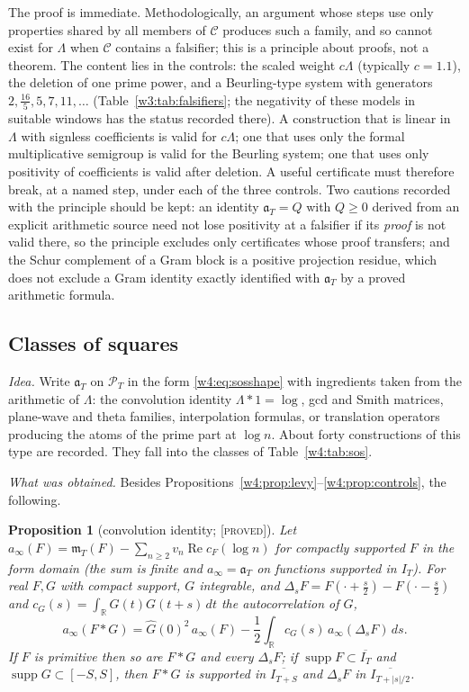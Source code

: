 \documentclass[11pt]{amsart}
\newtheorem{proposition}[theorem]{Proposition}
\theoremstyle{definition}
\theoremstyle{remark}
\numberwithin{equation}{section}
\newcommand{\R}{\mathbb{R}}
\DeclareMathOperator{\Rel}{Re}
\DeclareMathOperator{\supp}{supp}
\newcommand{\IT}{I_T}                                  %
\newcommand{\cF}{c_F}                                  %
\newcommand{\PT}{\mathcal{P}_T}                        %
\newcommand{\mT}{\mathfrak{m}_T}                       %
\newcommand{\aT}{\mathfrak{a}_T}                       %
\newcommand{\stag}[1]{\textsc{[#1]}}
\newcommand{\PROVED}{\stag{proved}}
\newcommand{\entry}[1]{\par\smallskip\noindent\textit{#1.}\enspace}
\begin{document}
The proof is immediate. Methodologically, an argument whose steps use only properties shared by all members of $\mathcal C$
produces such a family, and so cannot exist for $\Lambda$ when $\mathcal C$ contains a falsifier; this is a principle about proofs,
not a theorem. The content lies in the controls: the scaled weight $c\Lambda$ (typically $c=1.1$), the deletion of one prime
power, and a Beurling-type system with generators $2,\frac{16}5,5,7,11,\dots$ (Table~\ref{w3:tab:falsifiers}; the negativity of
these models in suitable windows has the status recorded there). A construction that is linear in $\Lambda$ with signless
coefficients is valid for $c\Lambda$; one that uses only the formal multiplicative semigroup is valid for the Beurling system; one
that uses only positivity of coefficients is valid after deletion. A useful certificate must therefore break, at a named step, under
each of the three controls. Two cautions recorded with the principle should be kept: an identity $\aT=Q$ with $Q\ge0$ derived
from an explicit arithmetic source need not lose positivity at a falsifier if its \emph{proof} is not valid there, so the
principle excludes only certificates whose proof transfers; and the Schur complement of a Gram block is a positive projection
residue, which does not exclude a Gram identity exactly identified with $\aT$ by a proved arithmetic formula.

\subsection{Classes of squares}\label{w4:fam:R1}

\entry{Idea} Write $\aT$ on $\PT$ in the form \eqref{w4:eq:sosshape} with ingredients taken from the arithmetic of $\Lambda$: the
convolution identity $\Lambda*1=\log$, gcd and Smith matrices, plane-wave and theta families, interpolation formulas, or translation
operators producing the atoms of the prime part at $\log n$. About forty constructions of this type are recorded. They fall into the
classes of Table~\ref{w4:tab:sos}.

\entry{What was obtained} Besides Propositions~\ref{w4:prop:levy}--\ref{w4:prop:controls}, the following.

\begin{proposition}[convolution identity; \PROVED]\label{w4:prop:conv}
Let $a_\infty(F)=\mT(F)-\sum_{n\ge2}v_n\Rel\cF(\log n)$ for compactly supported $F$ in the form domain (the sum is finite and
$a_\infty=\aT$ on functions supported in $\IT$). For real $F,G$ with compact support, $G$ integrable, and $\Delta_sF=F(\cdot+\frac s2)-F(\cdot-\frac s2)$ and $c_G(s)=\int_\R G(t)G(t+s)\,dt$ the autocorrelation of $G$,
\[
a_\infty(F*G)=\widehat G(0)^2\,a_\infty(F)-\frac12\int_{\R}c_G(s)\,a_\infty(\Delta_sF)\,ds .
\]
If $F$ is primitive then so are $F*G$ and every $\Delta_sF$; if $\supp F\subset\overline{I_T}$ and $\supp G\subset[-S,S]$, then $F*G$ is
supported in $\overline{I_{T+S}}$ and $\Delta_sF$ in $\overline{I_{T+|s|/2}}$.
\end{proposition}
\end{document}
